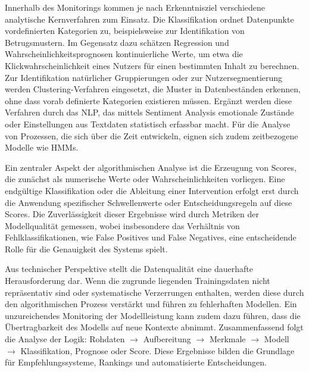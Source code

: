 Innerhalb des Monitorings kommen je nach Erkenntnisziel verschiedene analytische Kernverfahren zum Einsatz. Die Klassifikation ordnet Datenpunkte vordefinierten Kategorien zu, beispielsweise zur Identifikation von Betrugsmustern. Im Gegensatz dazu schätzen Regression und Wahrscheinlichkeitsprognosen kontinuierliche Werte, um etwa die Klickwahrscheinlichkeit eines Nutzers für einen bestimmten Inhalt zu berechnen. Zur Identifikation natürlicher Gruppierungen oder zur Nutzersegmentierung werden Clustering-Verfahren eingesetzt, die Muster in Datenbeständen erkennen, ohne dass vorab definierte Kategorien existieren müssen. Ergänzt werden diese Verfahren durch das \ac{NLP}, das mittels Sentiment Analysis emotionale Zustände oder Einstellungen aus Textdaten statistisch erfassbar macht. Für die Analyse von Prozessen, die sich über die Zeit entwickeln, eignen sich zudem zeitbezogene Modelle wie \acp{HMM}.

Ein zentraler Aspekt der algorithmischen Analyse ist die Erzeugung von Scores, die zunächst als numerische Werte oder Wahrscheinlichkeiten vorliegen. Eine endgültige Klassifikation oder die Ableitung einer Intervention erfolgt erst durch die Anwendung spezifischer Schwellenwerte oder Entscheidungsregeln auf diese Scores. Die Zuverlässigkeit dieser Ergebnisse wird durch Metriken der Modellqualität gemessen, wobei insbesondere das Verhältnis von Fehlklassifikationen, wie False Positives und False Negatives, eine entscheidende Rolle für die Genauigkeit des Systems spielt.

Aus technischer Perspektive stellt die Datenqualität eine dauerhafte Herausforderung dar. Wenn die zugrunde liegenden Trainingsdaten nicht repräsentativ sind oder systematische Verzerrungen enthalten, werden diese durch den algorithmischen Prozess verstärkt und führen zu fehlerhaften Modellen. Ein unzureichendes Monitoring der Modellleistung kann zudem dazu führen, dass die Übertragbarkeit des Modells auf neue Kontexte abnimmt. Zusammenfassend folgt die Analyse der Logik: Rohdaten $\rightarrow$ Aufbereitung $\rightarrow$ Merkmale $\rightarrow$ Modell $\rightarrow$ Klassifikation, Prognose oder Score. Diese Ergebnisse bilden die Grundlage für Empfehlungssysteme, Rankings und automatisierte Entscheidungen.

